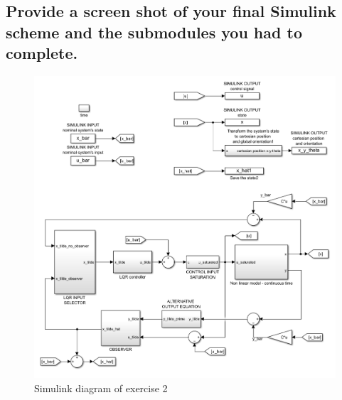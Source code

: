 \subsection{Provide a screen shot of your final Simulink scheme and the submodules you had to complete.}
\begin{figure}[H]
    \centering
    \includegraphics[width = 0.8\linewidth]{Latex report/image/ex2Simulink.png}
    \caption{Simulink diagram of exercise 2}
    \label{fig:ex2Simulink}
\end{figure}


